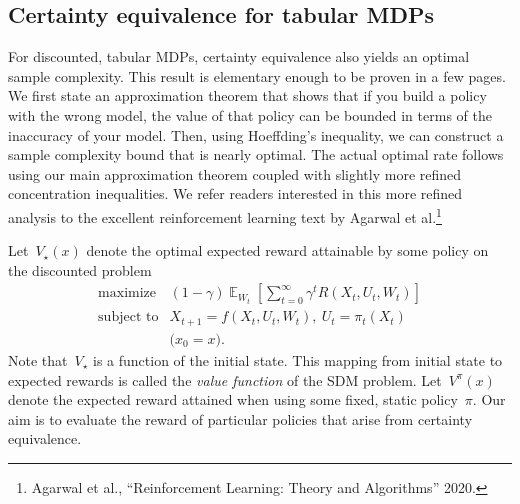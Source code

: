 \documentclass{tufte-book}
\begin{document}
\hypertarget{certainty-equivalence-for-tabular-mdps}{%
\subsection{Certainty equivalence for tabular
MDPs}\label{certainty-equivalence-for-tabular-mdps}}

For discounted, tabular MDPs, certainty equivalence also yields an
optimal sample complexity. This result is elementary enough to be proven
in a few pages. We first state an approximation theorem that shows that
if you build a policy with the wrong model, the value of that policy can
be bounded in terms of the inaccuracy of your model. Then, using
Hoeffding's inequality, we can construct a sample complexity bound that
is nearly optimal. The actual optimal rate follows using our main
approximation theorem coupled with slightly more refined concentration
inequalities. We refer readers interested in this more refined analysis
to the excellent reinforcement learning text by Agarwal et
al.\footnote{Agarwal et al., {``Reinforcement Learning: Theory and
  Algorithms''} 2020.}

Let~\(V_\star(x)\) denote the optimal expected reward attainable by some
policy on the discounted problem \[
    \begin{array}{ll}
        \text{maximize} &  (1-\gamma) \mathop\mathbb{E}_{W_t}[ \sum_{t=0}^\infty \gamma^t R(X_t,U_t,W_t) ]\\
        \text{subject to} & X_{t+1} = f(X_t, U_t, W_t),~U_t=\pi_t(X_t)\\
        & \text{($x_0=x$).}
    \end{array}
\] Note that~\(V_\star\) is a function of the initial state. This
mapping from initial state to expected rewards is called the \emph{value
function} of the SDM problem. Let~\(V^{\pi}(x)\) denote the expected
reward attained when using some fixed, static policy~\(\pi\). Our aim is
to evaluate the reward of particular policies that arise from certainty
equivalence.
\end{document}
